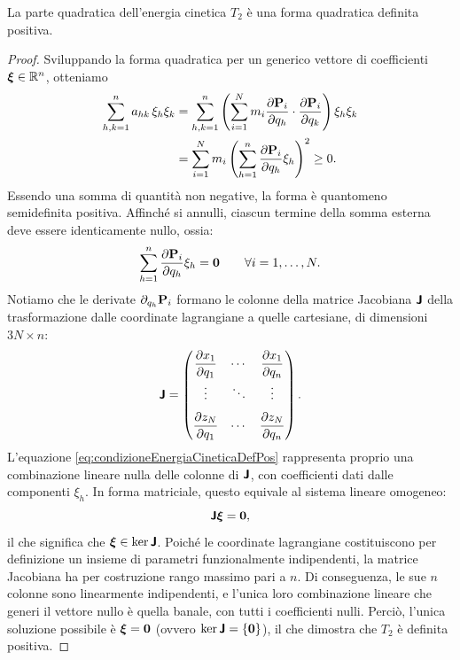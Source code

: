 \begin{proposition}
    La parte quadratica dell'energia cinetica $T_2$ è una forma quadratica definita positiva.
\end{proposition}
\begin{proof}
    Sviluppando la forma quadratica per un generico vettore di coefficienti $\vb*{\xi} \in \mathbb{R}^n$, otteniamo
    \begin{align*}
        \sum_{h,k=1}^n a_{hk}\, \xi_h \xi_k &= \sum_{h,k=1}^n\left(\sum_{i=1}^N m_i \pdv{\vb{P}_i}{q_h}\cdot \pdv{\vb{P}_i}{q_k}\right)\xi_h \xi_k \\
        &= \sum_{i=1}^N m_i \left( \sum_{h=1}^n \pdv{\vb{P}_i}{q_h} \xi_h \right)^2 \geq 0.
    \end{align*}
    Essendo una somma di quantità non negative, la forma è quantomeno semidefinita positiva. Affinché si annulli, ciascun termine della somma esterna deve essere identicamente nullo, ossia:
    \begin{equation} \label{eq:condizioneEnergiaCineticaDefPos}
        \sum_{h=1}^n \pdv{\vb{P}_i}{q_h} \xi_h = \vb{0} \qquad \forall i = 1, \dots, N.
    \end{equation}
    Notiamo che le derivate $\partial_{q_h} \vb{P}_i$ formano le colonne della matrice Jacobiana $\boldsymbol{\mathsf{J}}$ della trasformazione dalle coordinate lagrangiane a quelle cartesiane, di dimensioni $3N \times n$:
    \begin{equation*}
        \boldsymbol{\mathsf{J}} = \begin{pmatrix}
            \displaystyle\pdv{x_1}{q_1} & \cdots & \displaystyle\pdv{x_1}{q_n} \\[0.7em]
            \vdots & \ddots & \vdots \\[0.7em]
            \displaystyle\pdv{z_N}{q_1} & \cdots & \displaystyle\pdv{z_N}{q_n}
        \end{pmatrix}.
    \end{equation*}
    L'equazione \eqref{eq:condizioneEnergiaCineticaDefPos} rappresenta proprio una combinazione lineare nulla delle colonne di $\boldsymbol{\mathsf{J}}$, con coefficienti dati dalle componenti $\xi_h$. In forma matriciale, questo equivale al sistema lineare omogeneo:
    \begin{equation*}
        \boldsymbol{\mathsf{J}}\vb*{\xi} = \vb{0},
    \end{equation*}
    il che significa che $\vb*{\xi}\in\ker\boldsymbol{\mathsf{J}}$. Poiché le coordinate lagrangiane costituiscono per definizione un insieme di parametri funzionalmente indipendenti, la matrice Jacobiana ha per costruzione rango massimo pari a $n$. Di conseguenza, le sue $n$ colonne sono linearmente indipendenti, e l'unica loro combinazione lineare che generi il vettore nullo è quella banale, con tutti i coefficienti nulli. Perciò, l'unica soluzione possibile è $\vb*{\xi} = \vb{0}$ (ovvero $\ker\boldsymbol{\mathsf{J}} = \{\vb{0}\}$), il che dimostra che $T_2$ è definita positiva.
\end{proof}